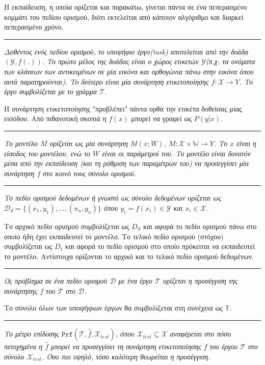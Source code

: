 Η εκπαίδευση, η οποία ορίζεται και παρακάτω, γίνεται πάντα σε ένα πεπερασμένο κομμάτι του πεδίου ορισμού, διότι εκτελείται από κάποιον αλγόριθμο και διαρκεί πεπερασμένο χρόνο.
\vspace{1ex}\\
{ \rule{1ex}{1ex} }%
\textit{Δοθέντος ενός πεδίου ορισμού, το υποψήφιο έργο(task) αποτελείται από την δυάδα $(\mathcal{Y}, f(.))$. Το πρώτο μέλος της δυάδας είναι ο χώρος ετικετών $\mathcal{Y}$(π.χ. τα ονόματα των κλάσεων των αντικειμένων σε μία εικόνα και ορθογώνια πάνω στην εικόνα όπου αυτά παρατηρούνται). Το δεύτερο είναι μία συνάρτηση ετικετοποίησης $ f:\mathcal{X} \rightarrow Y$. Το έργο συμβολίζεται με το γράμμα $\mathcal{T}$.}

Η συνάρτηση ετικετοποίησης "προβλέπει" πάντα ορθά την ετικέτα δοθείσας μίας εισόδου. Από πιθανοτική σκοπιά η $f(x)$ μπορεί να γραφεί ως $P(y|x)$. 
\vspace{1ex}\\
{ \rule{1ex}{1ex} }%
\textit{Το μοντέλο $M$ ορίζεται ως μία συνάρτηση $M(x;W)$, $M:\mathcal{X}\times \mathbb{W} \rightarrow Y$. Το $x$ είναι η είσοδος του μοντέλου, ενώ το $W$ είναι οι παράμετροί του. Το μοντέλο είναι δυνατόν μέσα από την εκπαίδευση (και τη ρύθμιση των παραμέτρων του) να προσεγγίσει μία συνάρτηση $f$ στο κοινό τους σύνολο ορισμού.}
\vspace{1ex}\\
{ \rule{1ex}{1ex} }%
\textit{Το πεδίο ορισμού δεδομένων ή γνωστό ως σύνολο δεδομένων ορίζεται ως $\mathcal{D}_d =\{(x_1, y_1), \dotsc, (x_n,y_n)\}$ όπου $y_i = f(x_i) \in \mathcal{Y}$ και $ x_i \in \mathcal{X}$.}

Το αρχικό πεδίο ορισμού συμβολίζεται ως $D_S$ και αφορά το πεδίο ορισμού πάνω στο οποίο ήδη έχει εκπαιδευτεί το μοντέλο. Το τελικό πεδίο ορισμού (στόχου) συμβολίζεται ως $D_t$ και αφορά το πεδίο ορισμού στο οποίο πρόκειται να εκπαιδευτεί το μοντέλο.
Αντίστοιχα ορίζονται το αρχικό και το τελικό πεδίο ορισμού δεδομένων.
\vspace{1ex}\\
{ \rule{1ex}{1ex} }%
\textit{Ως πρόβλημα σε ένα πεδίο ορισμού $\mathcal{D}$ με ένα έργο $\mathcal{T}$ ορίζεται η προσέγγιση της συνάρτησης $f$ του $\mathcal{T}$ στο $\mathcal{D}$.}

Το σύνολο όλων των υποψήφιων έργων θα συμβολίζεται στη συνέχεια ως $\mathbb{T}$.
\vspace{1ex}\\
{ \rule{1ex}{1ex} }%
\textit{Το μέτρο επίδοσης $ \mathtt{Prf}\left(\mathcal{T}, \hat{f}, \mathcal{X}_{test}\right)$, όπου $\mathcal{X}_{test} \subseteq \mathcal{X}$ αναφέρεται στο πόσο πετυχημένα η $\hat{f}$ μπορεί να προσεγγίσει τη συνάρτηση ετικετοποίησης $f$ του έργου $\mathcal{T}$ στο σύνολο $\mathcal{X}_{test}$. Όσο πιο υψηλό, τόσο καλύτερη θεωρείται η προσέγγιση.}

